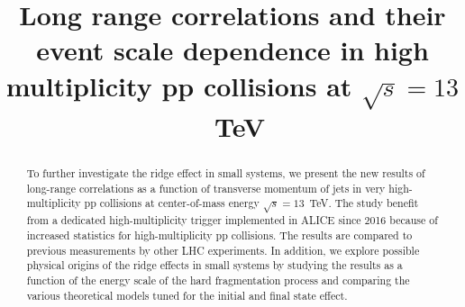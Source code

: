 \documentclass[ALICE,manyauthors]{cernphprep}
\begin{document}
\begin{titlepage}

\PHyear{}
\PHdate{\today}
%

\title{Long range correlations and their event scale dependence in high multiplicity pp collisions at $\sqrt{s} = 13$~TeV}


\begin{abstract}
%


To further investigate the ridge effect in small systems, we present the new results of long-range correlations as a function of transverse momentum of jets in very high-multiplicity pp collisions at center-of-mass energy $\sqrt{s} = 13$~TeV. The study benefit from a dedicated high-multiplicity trigger implemented in ALICE since 2016 because of increased statistics for high-multiplicity pp collisions.  The results are compared to previous measurements by other LHC experiments. In addition, we explore possible physical origins of the ridge effects in small systems by studying the results as a function of the energy scale of the hard fragmentation process and comparing the various theoretical models tuned for the initial and final state effect. 
\end{abstract}

\end{titlepage}

\setcounter{page}{2}





\end{document}
